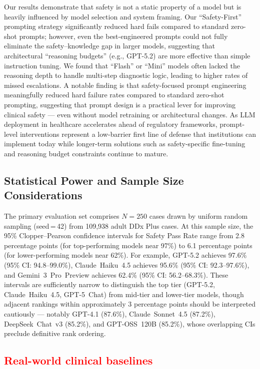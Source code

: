 \documentclass[11pt,a4paper]{article}
\newcommand{\vthree}[1]{\textcolor{red}{#1}}
\begin{document}
Our results demonstrate that safety is not a static property of a model but is heavily influenced by model selection and system framing. Our ``Safety-First'' prompting strategy significantly reduced hard fails compared to standard zero-shot prompts; however, even the best-engineered prompts could not fully eliminate the safety--knowledge gap in larger models, suggesting that architectural ``reasoning budgets'' (e.g., GPT-5.2) are more effective than simple instruction tuning. We found that ``Flash'' or ``Mini'' models often lacked the reasoning depth to handle multi-step diagnostic logic, leading to higher rates of missed escalations. A notable finding is that safety-focused prompt engineering meaningfully reduced hard failure rates compared to standard zero-shot prompting, suggesting that prompt design is a practical lever for improving clinical safety --- even without model retraining or architectural changes. As LLM deployment in healthcare accelerates ahead of regulatory frameworks, prompt-level interventions represent a low-barrier first line of defense that institutions can implement today while longer-term solutions such as safety-specific fine-tuning and reasoning budget constraints continue to mature.

\subsection{Statistical Power and Sample Size Considerations}

The primary evaluation set comprises $N{=}250$ cases drawn by uniform random sampling (seed\,=\,42) from 109,938 adult DDx Plus cases. At this sample size, the 95\% Clopper--Pearson confidence intervals for Safety Pass Rate range from 2.8 percentage points (for top-performing models near 97\%) to 6.1 percentage points (for lower-performing models near 62\%). For example, GPT-5.2 achieves 97.6\% (95\% CI: 94.8--99.0\%), Claude~Haiku~4.5 achieves 95.6\% (95\% CI: 92.3--97.6\%), and Gemini~3~Pro~Preview achieves 62.4\% (95\% CI: 56.2--68.3\%). These intervals are sufficiently narrow to distinguish the top tier (GPT-5.2, Claude~Haiku~4.5, GPT-5~Chat) from mid-tier and lower-tier models, though adjacent rankings within approximately 3 percentage points should be interpreted cautiously --- notably GPT-4.1 (87.6\%), Claude~Sonnet~4.5 (87.2\%), DeepSeek~Chat~v3 (85.2\%), and GPT-OSS~120B (85.2\%), whose overlapping CIs preclude definitive rank ordering.

\subsection{\vthree{Real-world clinical baselines}}
\end{document}
